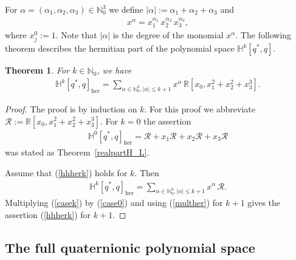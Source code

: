 \documentclass[11pt,a4paper]{amsart}
\newtheorem{theorem}{Theorem}[section]
\theoremstyle{definition}
\begin{document}
For
$\alpha =(\alpha _{1},\alpha _{2},\alpha _{3})\in \mathbb{N}_{0}^{3}$ we
define $|\alpha |:=\alpha _{1}+\alpha _{2}+\alpha _{3}$ and
%
\begin{align}
x^{\alpha }= x_{1}^{\alpha _{1}}\, x_{2}^{\alpha _{2}}\, x_{3}^{\alpha _{3}},
\label{eq41}
\end{align}
%
where $x_{j}^{0}:=1$. Note that $|\alpha |$ is the degree of the monomial
$x^{\alpha}$. The following theorem describes the hermitian part of the
polynomial space $\mathbb{H}^{k}[q^{*},q]$.
%
\begin{theorem}%
\label{herhk}
For $k\in \mathbb{N}_{0}$, we have
%
\begin{align}
\label{hhherk}
\mathbb{H}^{k}[q^{*},q]_{\mathrm{her}}=\sum _{\alpha \in \mathbb{N}_{0}^{3},
|\alpha |\leq k+1} x^{\alpha}\, \mathbb{R}[x_{0},x_{1}^{2}+x_{2}^{2}+x_{3}^{3}].
\end{align}
%
\end{theorem}
%
\begin{proof}
The proof is by induction on $k$. For this proof we abbreviate
$\mathcal{R}:= \mathbb{R}[x_{0},x_{1}^{2}+x_{2}^{2}+x_{3}^{3}]$. For
$k=0$ the assertion
%
\begin{align}
\label{case0}
\mathbb{H}^{0}[q^{*},q]_{\mathrm{her}}=\mathcal{R}+x_{1}\mathcal{R}+x_{2}
\mathcal{R}+x_{3}\mathcal{R}
\end{align}
%
was stated as Theorem~\ref{realpartH_L}.

Assume that (\ref{hhherk}) holds for $k$. Then
%
\begin{align}
\label{casek}
\mathbb{H}^{k}[q^{*},q]_{\mathrm{her}}=\sum _{\alpha \in \mathbb{N}_{0}^{3},
|\alpha |\leq k+1} x^{\alpha}\, \mathcal{R}.
\end{align}
%
Multiplying (\ref{casek}) by (\ref{case0}) and using (\ref{multher}) for
$k+1$ gives the assertion (\ref{hhherk}) for $k+1$.
\end{proof}

\subsection{The full quaternionic polynomial space}
\label{sec4.3}
\end{document}
